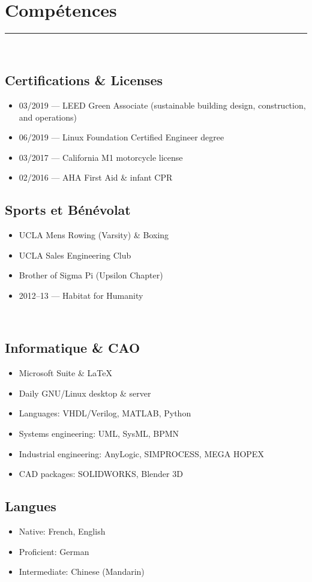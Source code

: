 \documentclass[10pt]{report}
\begin{document}
\section*{Compétences}
\rule{\linewidth}{1pt}\\[0.2cm]
\begin{minipage}[t]{0.52\linewidth}
    \subsection*{Certifications \& Licenses}
    \begin{itemize}
        \item 03/2019 --- LEED Green Associate (sustainable building design, construction, and operations)
        \item 06/2019 --- Linux Foundation Certified Engineer degree
        \item 03/2017 --- California M1 motorcycle license
        \item 02/2016 --- AHA First Aid \& infant CPR
    \end{itemize}
    \subsection*{Sports et Bénévolat}
    \begin{itemize}
        \item UCLA Mens Rowing (Varsity) \& Boxing
        \item UCLA Sales Engineering Club
        \item Brother of Sigma Pi (Upsilon Chapter)
        \item 2012--13 --- Habitat for Humanity
    \end{itemize}
\end{minipage}
~
\begin{minipage}[t]{0.44\linewidth}
    \subsection*{Informatique \& CAO}
    \begin{itemize}
        \item Microsoft Suite \& \LaTeX
        \item Daily GNU/Linux desktop \& server
        \item Languages: VHDL/Verilog, MATLAB, Python
        \item Systems engineering: UML, SysML, BPMN
        \item Industrial engineering: AnyLogic, SIMPROCESS, MEGA HOPEX
        \item CAD packages: SOLIDWORKS, Blender 3D
    \end{itemize}
    \subsection*{Langues}
    \begin{itemize}
        \item Native: French, English
        \item Proficient: German
        \item Intermediate: Chinese (Mandarin)
    \end{itemize}
\end{minipage}
\end{document}
